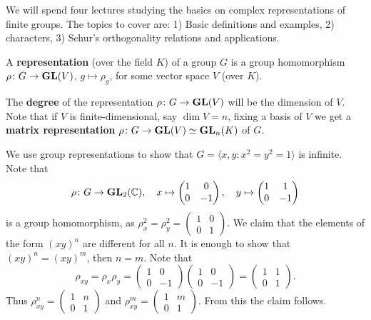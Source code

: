 \lecture{}


We will spend 
four lectures studying the basics on complex representations of finite groups. 
The topics to cover are: 1) Basic definitions and examples, 2) characters, 3)
Schur's orthogonality relations and applications. 

\begin{definition}
	A \textbf{representation} (over the field $K$) of a group $G$ is a group homomorphism
	$\rho\colon G\to\mathbf{GL}(V)$, $g\mapsto\rho_g$, for some vector space $V$ (over $K$).
\end{definition}

The \textbf{degree} of the representation $\rho\colon G\to\mathbf{GL}(V)$ will be the dimension of $V$. Note that
if $V$ is finite-dimensional, say $\dim V=n$, fixing a basis of $V$ we get a \textbf{matrix representation} 
$\rho\colon G\to\mathbf{GL}(V)\simeq\mathbf{GL}_n(K)$ of $G$.  

\begin{example}
	We use group representations to show that 
	$G=\langle x,y:x^2=y^2=1\rangle$ is infinite. Note that
	\[
	\rho\colon G\to\mathbf{GL}_2(\mathbb{C}),
	\quad
	x\mapsto\begin{pmatrix}
		1&0\\
		0&-1	
	\end{pmatrix},\quad
 	y\mapsto\begin{pmatrix}
		1&1\\
		0&-1	
	\end{pmatrix}
 	\]
 	is a group homomorphism, as 
 	$\rho_x^2=\rho_y^2=\begin{pmatrix}
		1&0\\
		0&1	
	\end{pmatrix}$. We claim that the elements of the form $(xy)^n$ are
	different for all $n$. It is enough to show that   
	$(xy)^n=(xy)^m$, then $n=m$. Note that
	\[
	\rho_{xy}=\rho_x\rho_y=\begin{pmatrix}
		1&0\\
		0&-1	
	\end{pmatrix}
	\begin{pmatrix}
		1&0\\
		0&-1	
	\end{pmatrix}
	=\begin{pmatrix}
		1&1\\
		0&1	
	\end{pmatrix}.
	\]
	Thus $\rho_{xy}^n=\begin{pmatrix}
		1&n\\
		0&1	
	\end{pmatrix}$ and 
	$\rho_{xy}^m=\begin{pmatrix}
		1&m\\
		0&1	
	\end{pmatrix}$. From this the claim follows.
\end{example}

